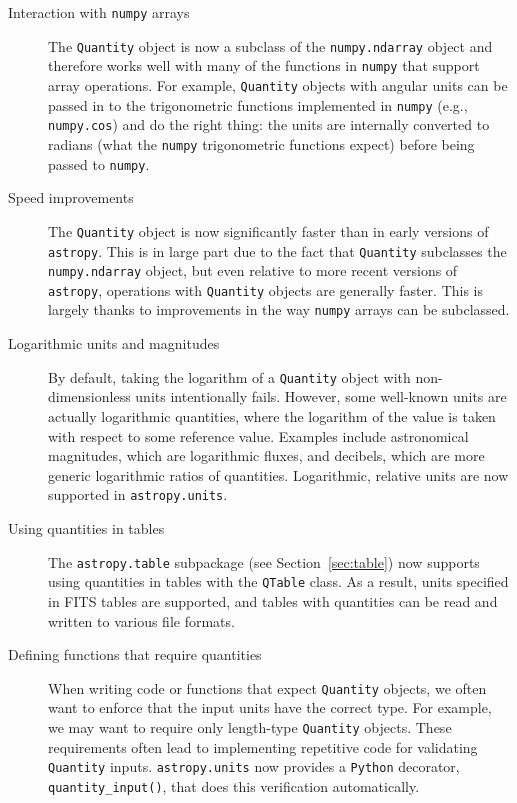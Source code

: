 \documentclass[modern]{aastex61}
\newcommand{\package}[1]{\texttt{#1}\xspace}
\newcommand{\python}{\package{Python}}
\newcommand{\astropypkg}{\package{astropy}}
\newcommand{\sectionname}{Section\xspace}
\begin{document}
\begin{description}
    \item[Interaction with \package{numpy} arrays] The \texttt{Quantity} object
        is now a subclass of the \texttt{numpy.ndarray} object and therefore
        works well with many of the functions in \texttt{numpy} that support
        array operations. For example, \texttt{Quantity} objects with angular
        units can be passed in to the trigonometric functions implemented in
        \texttt{numpy} (e.g., \texttt{numpy.cos}) and do the right thing: the
        units are internally converted to radians (what the \texttt{numpy}
        trigonometric functions expect) before being passed to \texttt{numpy}.
    \item[Speed improvements] The \texttt{Quantity} object is now significantly
        faster than in early versions of \astropypkg. This is in large part due
        to the fact that \texttt{Quantity} subclasses the \texttt{numpy.ndarray}
        object, but even relative to more recent versions of \astropypkg,
        operations with \texttt{Quantity} objects are generally faster. This is
        largely thanks to improvements in the way \texttt{numpy} arrays can be
        subclassed.
    \item[Logarithmic units and magnitudes] By default, taking the logarithm of
        a \texttt{Quantity} object with non-dimensionless units intentionally
        fails.
        However, some well-known units are actually logarithmic quantities,
        where the logarithm of the value is taken with respect to some reference
        value.
        Examples include astronomical magnitudes, which are logarithmic fluxes,
        and decibels, which are more generic logarithmic ratios of quantities.
        Logarithmic, relative units are now supported in \texttt{astropy.units}.
    \item[Using quantities in tables] The \texttt{astropy.table} subpackage (see
        \sectionname~\ref{sec:table}) now supports using quantities in tables
        with the \texttt{QTable} class.
        As a result, units specified in FITS tables are supported, and tables
        with quantities can be read and written to various file formats.
    \item[Defining functions that require quantities] When writing code or
        functions that expect \texttt{Quantity} objects, we often want to
        enforce that the input units have the correct type.
        For example, we may want to require only length-type \texttt{Quantity}
        objects.
        These requirements often lead to implementing repetitive code for
        validating \texttt{Quantity} inputs.
        \texttt{astropy.units} now provides a \python decorator,
        \texttt{quantity\_input()}, that does this verification automatically.
\end{description}
\end{document}
